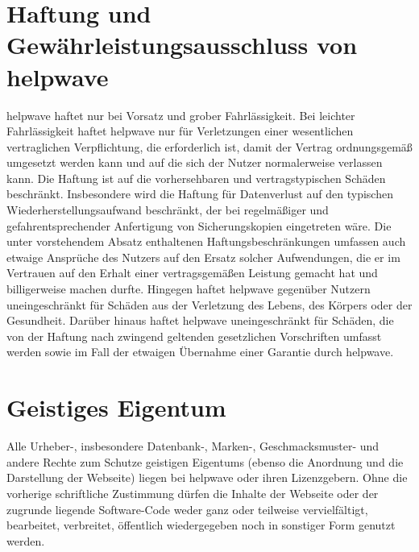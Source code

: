 \documentclass[10pt]{article}
\begin{document}
\section{Haftung und Gewährleistungsausschluss von helpwave}
helpwave haftet nur bei Vorsatz und grober Fahrlässigkeit. Bei leichter Fahrlässigkeit haftet helpwave nur für Verletzungen
einer wesentlichen vertraglichen Verpflichtung, die erforderlich ist, damit der Vertrag ordnungsgemäß umgesetzt werden
kann und auf die sich der Nutzer normalerweise verlassen kann. Die Haftung ist auf die vorhersehbaren und vertragstypischen Schäden beschränkt. Insbesondere wird die Haftung für Datenverlust auf den typischen Wiederherstellungsaufwand
beschränkt, der bei regelmäßiger und gefahrentsprechender Anfertigung von Sicherungskopien eingetreten wäre.
Die unter vorstehendem Absatz enthaltenen Haftungsbeschränkungen umfassen auch etwaige Ansprüche des Nutzers auf
den Ersatz solcher Aufwendungen, die er im Vertrauen auf den Erhalt einer vertragsgemäßen Leistung gemacht hat und
billigerweise machen durfte.
Hingegen haftet helpwave gegenüber Nutzern uneingeschränkt für Schäden aus der Verletzung des Lebens, des Körpers
oder der Gesundheit. Darüber hinaus haftet helpwave uneingeschränkt für Schäden, die von der Haftung nach zwingend
geltenden gesetzlichen Vorschriften umfasst werden sowie im Fall der etwaigen Übernahme einer Garantie durch helpwave.

\section{Geistiges Eigentum}
Alle Urheber-, insbesondere Datenbank-, Marken-, Geschmacksmuster- und andere Rechte zum Schutze geistigen Eigentums
(ebenso die Anordnung und die Darstellung der Webseite) liegen bei helpwave oder ihren Lizenzgebern. Ohne die vorherige
schriftliche Zustimmung dürfen die Inhalte der Webseite oder der zugrunde liegende Software-Code weder ganz oder teilweise vervielfältigt, bearbeitet, verbreitet, öffentlich wiedergegeben noch in sonstiger Form genutzt werden.
\end{document}
